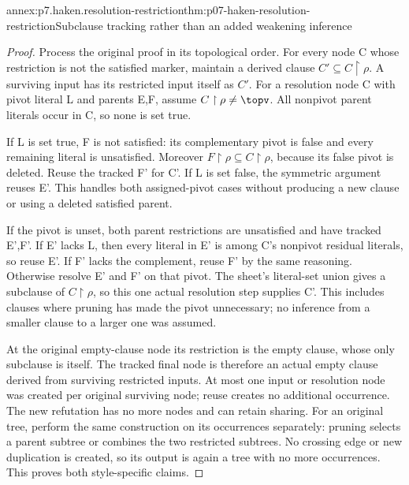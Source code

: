 \begin{annexitem}{annex:p7.haken.resolution-restriction}{thm:p07-haken-resolution-restriction}{Subclause tracking rather than an added weakening inference}
\begin{proof}
Process the original proof in its topological order. For every
node C whose restriction is not the satisfied marker, maintain
a derived clause \(C'\subseteq C\upharpoonright\rho\).
A surviving input has its restricted input itself as \(C'\).
For a resolution node C with pivot literal L and parents E,F,
assume \(C\upharpoonright\rho\ne\topv\).
All nonpivot parent literals occur in C, so none is set true.

If L is set true, F is not satisfied: its complementary pivot
is false and every remaining literal is unsatisfied. Moreover
\(F\upharpoonright\rho\subseteq C\upharpoonright\rho\),
because its false pivot is deleted. Reuse the tracked F' for
C'. If L is set false, the symmetric argument reuses E'.
This handles both assigned-pivot cases without producing a
new clause or using a deleted satisfied parent.

If the pivot is unset, both parent restrictions are unsatisfied
and have tracked E',F'. If E' lacks L, then every literal in
E' is among C's nonpivot residual literals, so reuse E'.
If F' lacks the complement, reuse F' by the same reasoning.
Otherwise resolve E' and F' on that pivot. The sheet's literal-set
union gives a subclause of \(C\upharpoonright\rho\), so this
one actual resolution step supplies C'. This includes clauses
where pruning has made the pivot unnecessary; no inference from
a smaller clause to a larger one was assumed.

At the original empty-clause node its restriction is the empty
clause, whose only subclause is itself. The tracked final node
is therefore an actual empty clause derived from surviving
restricted inputs. At most one input or resolution node was
created per original surviving node; reuse creates no additional
occurrence. The new refutation has no more nodes and can retain
sharing. For an original tree, perform the same construction
on its occurrences separately: pruning selects a parent subtree
or combines the two restricted subtrees. No crossing edge or
new duplication is created, so its output is again a tree with
no more occurrences. This proves both style-specific claims.
\end{proof}
\end{annexitem}

